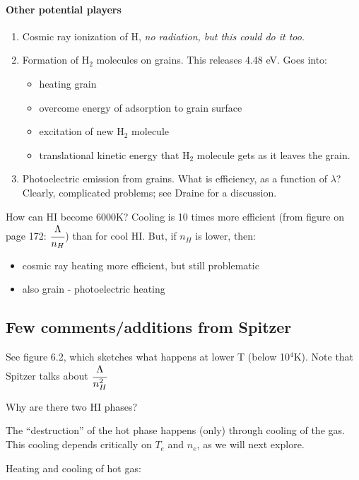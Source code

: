 \documentclass[12pt]{article}
\newcommand{\mar}[1]{\hspace{0pt}\marginpar{-\textcolor{black}{#1}-}}
\newcommand{\mynotes}[1]{{\fontfamily{cmss}\selectfont \textit{#1}}}
\begin{document}
\paragraph{Other potential players}
\begin{enumerate}[label=(\alph*)]
    \item Cosmic ray ionization of H, \mynotes{no radiation, but this
        could do it too}.
    \item Formation of H$_{2}$ molecules on grains.
        This releases 4.48 eV. Goes into:
        \begin{itemize}
            \item heating grain
            \item overcome energy of adsorption to grain surface
            \item excitation of new H$_{2}$ molecule
            \item translational kinetic energy that H$_{2}$ molecule
                gets as it leaves the grain.
        \end{itemize}
    \item Photoelectric emission from grains. What is efficiency, as a
        function of $\lambda$? Clearly, complicated problems; see
        Draine for a discussion.
\end{enumerate}
How can HI become 6000K? Cooling is 10 times more efficient
(from figure on page 172: $\cfrac{\Lambda}{n_{H}}$) than for cool HI.
But, if $n_{H}$ is lower, then:
\begin{itemize}
    \item cosmic ray heating more efficient, but still problematic
    \item also grain - photoelectric heating
\end{itemize}

\subsection{Few comments/additions from Spitzer}
See figure 6.2, which sketches what happens at lower T (below 10$^{4}$K).
Note that Spitzer talks about $\cfrac{\Lambda}{n_{H}^{2}}$

\mar{166}Why are there two HI phases?

\mar{167}The ``destruction'' of the hot phase happens (only) through
cooling of the gas. This cooling depends critically on $T_{e}$ and
$n_{e}$, as we will next explore.

\mar{168}Heating and cooling of hot gas:
\end{document}
